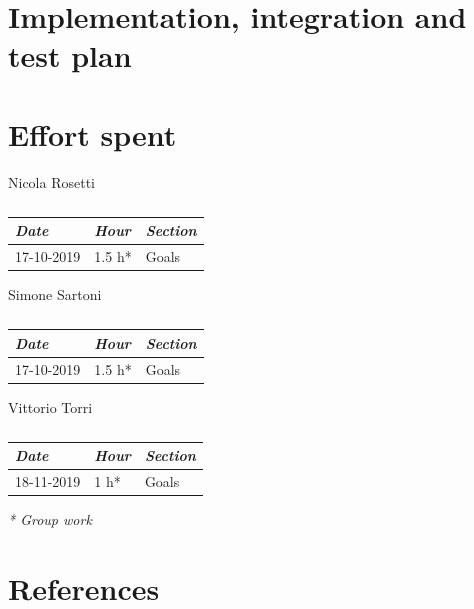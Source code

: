 \documentclass[a4paper]{report}
\begin{document}
\chapter{Implementation, integration and test plan}

\chapter{Effort spent}

\begin{table}[H]
\centering
Nicola Rosetti \\
\begin{tabular}{p{2cm}p{1.5cm}p{7cm}}
\toprule
\textit{Date} & \textit{Hour} & \textit{Section} \\ \midrule
17-10-2019 & 1.5 h* & Goals \\ \midrule
\bottomrule
\end{tabular}
\caption[Nicola Rosetti's effort table]{}
\end{table}


\vspace*{1 cm}
\begin{table}[H]
\centering
Simone Sartoni \\
\begin{tabular}{p{2cm}p{1.5cm}p{7cm}}
\toprule
\textit{Date} & \textit{Hour} & \textit{Section} \\ \midrule
17-10-2019 & 1.5 h* & Goals \\ \midrule
\bottomrule
\end{tabular}
\caption[Simone Sartoni's effort table]{}
\end{table}
\vspace*{1 cm}
\begin{table}[H]
\centering
Vittorio Torri \\
\begin{tabular}{p{2cm}p{1.5cm}p{7cm}}
\toprule
\textit{Date} & \textit{Hour} & \textit{Section} \\ \midrule
18-11-2019 & 1 h* & Goals \\ \midrule
\bottomrule
\end{tabular}
\caption[Vittorio Torri's effort table]{}
\end{table}
\textit{* Group work}

\chapter{References}
\end{document}
